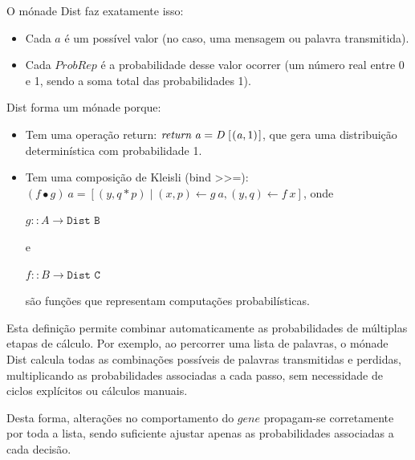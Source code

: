 \documentclass[11pt, a4paper, fleqn]{article}
\newcommand{\Conid}[1]{\mathit{#1}}
\newcommand{\Varid}[1]{\mathit{#1}}
\def\resethooks{%
  \global\let\SaveRestoreHook\empty
  \global\let\ColumnHook\empty}
\let\hspre\empty
\let\hspost\empty
\begin{document}
O mónade Dist faz exatamente isso:

\resethooks

\begin{itemize}
     \item Cada \ensuremath{\Varid{a}} é um possível valor (no caso, uma mensagem ou palavra transmitida).
     \item Cada \ensuremath{\Conid{ProbRep}} é a probabilidade desse valor ocorrer (um número real entre 0 e 1, sendo a soma total das probabilidades 1).
\end{itemize}

Dist forma um mónade porque:

\begin{itemize}
     \item Tem uma operação return: \ensuremath{\Varid{return}\;\Varid{a}\mathrel{=}\Conid{D}\;[\mskip1.5mu (\Varid{a},\mathrm{1})\mskip1.5mu]}, que gera uma distribuição determinística com probabilidade 1.  
     \item Tem uma composição de Kleisli (bind >>=): 
     $(f \bullet g)~a = [(y,q*p) \mid (x,p) \leftarrow g~a, (y,q) \leftarrow f~x]$,  
     onde 
     
     $g :: A \to \texttt{Dist B}$ 

     e 

     $f :: B \to \texttt{Dist C}$ 
    
     são funções que representam computações probabilísticas.  
\end{itemize}

Esta definição permite combinar automaticamente as probabilidades de múltiplas etapas de cálculo.
Por exemplo, ao percorrer uma lista de palavras, o mónade Dist calcula todas as combinações
possíveis de palavras transmitidas e perdidas, multiplicando as probabilidades associadas a cada passo,
sem necessidade de ciclos explícitos ou cálculos manuais.

Desta forma, alterações no comportamento do \ensuremath{\Varid{gene}} propagam-se corretamente por toda a lista,
sendo suficiente ajustar apenas as probabilidades associadas a cada decisão.
\end{document}
